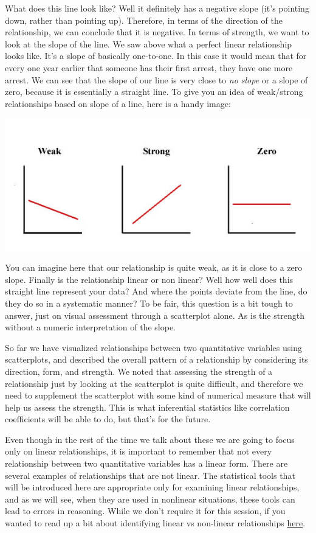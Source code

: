 \documentclass[
]{book}
\begin{document}
What does this line look like? Well it definitely has a negative slope (it's pointing down, rather than pointing up). Therefore, in terms of the direction of the relationship, we can conclude that it is negative. In terms of strength, we want to look at the slope of the line. We saw above what a perfect linear relationship looks like. It's a slope of basically one-to-one. In this case it would mean that for every one year earlier that someone has their first arrest, they have one more arrest. We can see that the slope of our line is very close to \emph{no slope} or a slope of zero, because it is essentially a straight line. To give you an idea of weak/strong relationships based on slope of a line, here is a handy image:

\includegraphics{imgs/examples2_corr.jpg}

You can imagine here that our relationship is quite weak, as it is close to a zero slope. Finally is the relationship linear or non linear? Well how well does this straight line represent your data? And where the points deviate from the line, do they do so in a systematic manner? To be fair, this question is a bit tough to answer, just on visual assessment through a scatterplot alone. As is the strength without a numeric interpretation of the slope.

So far we have visualized relationships between two quantitative variables using scatterplots, and described the overall pattern of a relationship by considering its direction, form, and strength. We noted that assessing the strength of a relationship just by looking at the scatterplot is quite difficult, and therefore we need to supplement the scatterplot with some kind of numerical measure that will help us assess the strength. This is what inferential statistics like correlation coefficients will be able to do, but that's for the future.

Even though in the rest of the time we talk about these we are going to focus only on linear relationships, it is important to remember that not every relationship between two quantitative variables has a linear form. There are several examples of relationships that are not linear. The statistical tools that will be introduced here are appropriate only for examining linear relationships, and as we will see, when they are used in nonlinear situations, these tools can lead to errors in reasoning. While we don't require it for this session, if you wanted to read up a bit about identifying linear vs non-linear relationships \href{http://blog.minitab.com/blog/adventures-in-statistics-2/linear-or-nonlinear-regression-that-is-the-question}{here}.
\end{document}
